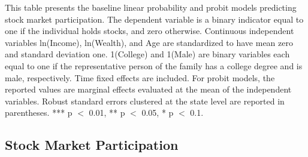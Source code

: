 \begin{table}[htbp]
\caption{Baseline Results}
\label{tab:2}
\begin{minipage}{\textwidth}
    \small This table presents the baseline linear probability and probit models predicting stock market participation. The dependent variable is a binary indicator equal to one if the individual holds stocks, and zero otherwise. Continuous independent variables ln(Income), ln(Wealth), and Age are standardized to have mean zero and standard deviation one. 1(College) and 1(Male) are binary variables each equal to one if the representative person of the family has a college degree and is male, respectively. Time fixed effects are included. For probit models, the reported values are marginal effects evaluated at the mean of the independent variables. Robust standard errors clustered at the state level are reported in parentheses. *** p $<$ 0.01, ** p $<$ 0.05, * p $<$ 0.1.
\end{minipage}

\small

\vspace{1ex}



\end{table}


\subsection{Stock Market Participation}
\label{sec:main_smp}

